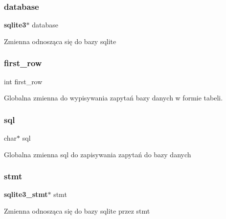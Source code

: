 \subsubsection{database}
{\footnotesize\ttfamily \textbf{ sqlite3}$\ast$ database}

Zmienna odnosząca się do bazy sqlite \mbox{\label{client__management_8cpp_a0e2e6fa96fb85ce52ae9d041b24bfda9}} 
\subsubsection{first\_row}
{\footnotesize\ttfamily int first\+\_\+row}

Globalna zmienna do wypisywania zapytań bazy danych w formie tabeli. \mbox{\label{client__management_8cpp_aa29adf0df91c751c5cae685ca18a251f}} 
\subsubsection{sql}
{\footnotesize\ttfamily char$\ast$ sql}

Globalna zmienna sql do zapisywania zapytań do bazy danych \mbox{\label{client__management_8cpp_a38b7f9e3afdf0f12a85d9abb3cd1e195}} 
\subsubsection{stmt}
{\footnotesize\ttfamily \textbf{ sqlite3\+\_\+stmt}$\ast$ stmt}

Zmienna odnosząca się do bazy sqlite przez stmt 